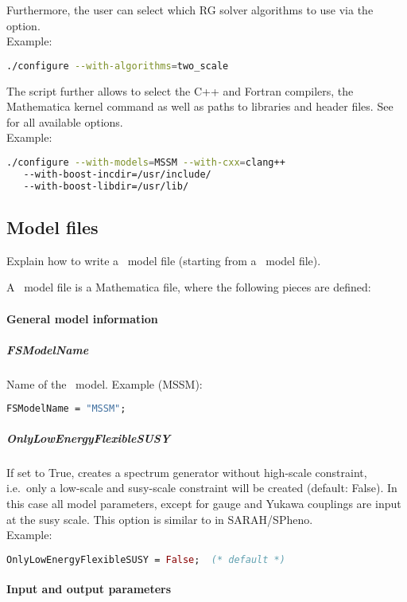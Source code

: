 Furthermore, the user can select which RG solver algorithms to use via
the  option.\\
Example:
%
\begin{lstlisting}[language=bash]
./configure --with-algorithms=two_scale
\end{lstlisting}

The  script further allows to select the C++ and
Fortran compilers, the Mathematica kernel command as well as paths to
libraries and header files.  See
 for all available options.\\
Example:
%
\begin{lstlisting}[language=bash]
./configure --with-models=MSSM --with-cxx=clang++
   --with-boost-incdir=/usr/include/
   --with-boost-libdir=/usr/lib/
\end{lstlisting}

\subsection{Model files}

Explain how to write a \flexisusy\ model file (starting from a \sarah\
model file).

A \flexisusy\ model file is a Mathematica file, where the following
pieces are defined:

\paragraph{General model information}

\subparagraph{FSModelName}
Name of the \flexisusy\ model.
Example (MSSM):
\begin{lstlisting}[language=Mathematica]
FSModelName = "MSSM";
\end{lstlisting}

\subparagraph{OnlyLowEnergyFlexibleSUSY} If set to True, creates a
spectrum generator without high-scale constraint, i.e.\ only a
low-scale and susy-scale constraint will be created (default: False).
In this case all model parameters, except for gauge and Yukawa
couplings are input at the susy scale.  This option is similar to
\code{OnlyLowEnergySPheno} in SARAH/SPheno.
\\
Example:
\begin{lstlisting}[language=Mathematica]
OnlyLowEnergyFlexibleSUSY = False;  (* default *)
\end{lstlisting}

\paragraph{Input and output parameters}

